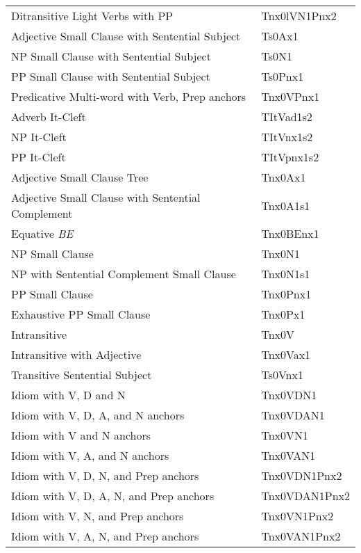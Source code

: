 \begin{tabular}{ll}
Ditransitive Light Verbs with PP & Tnx0lVN1Pnx2\\ 
Adjective Small Clause with Sentential Subject & Ts0Ax1\\ 
NP Small Clause with Sentential Subject &  Ts0N1\\ 
PP Small Clause with Sentential Subject & Ts0Pnx1\\ 
Predicative Multi-word with Verb, Prep anchors & Tnx0VPnx1\\ 
Adverb It-Cleft & TItVad1s2\\ 
NP It-Cleft & TItVnx1s2\\ 
PP It-Cleft & TItVpnx1s2\\ 
Adjective Small Clause Tree & Tnx0Ax1\\ 
Adjective Small Clause with Sentential Complement & Tnx0A1s1\\ 
Equative {\it BE} & Tnx0BEnx1\\ 
NP Small Clause & Tnx0N1\\ 
NP with Sentential Complement Small Clause & Tnx0N1s1\\ 
PP Small Clause & Tnx0Pnx1\\ 
Exhaustive PP Small Clause & Tnx0Px1\\ 
Intransitive & Tnx0V\\ 
Intransitive with Adjective & Tnx0Vax1\\ 
Transitive Sentential Subject &  Ts0Vnx1\\ 
Idiom with V, D and N & Tnx0VDN1\\ 
Idiom with V, D, A, and N anchors & Tnx0VDAN1\\ 
Idiom with V and N anchors & Tnx0VN1\\ 
Idiom with V, A, and N anchors & Tnx0VAN1\\ 
Idiom with V, D, N, and Prep anchors & Tnx0VDN1Pnx2\\ 
Idiom with V, D, A, N, and Prep anchors & Tnx0VDAN1Pnx2\\ 
Idiom with V, N, and Prep anchors & Tnx0VN1Pnx2\\ 
Idiom with V, A, N, and Prep anchors & Tnx0VAN1Pnx2 
\end{tabular} 
\normalsize 
 
\clearpage 
 
 
 
 
 
 
 
 
 
 
 
 
 
 
 
